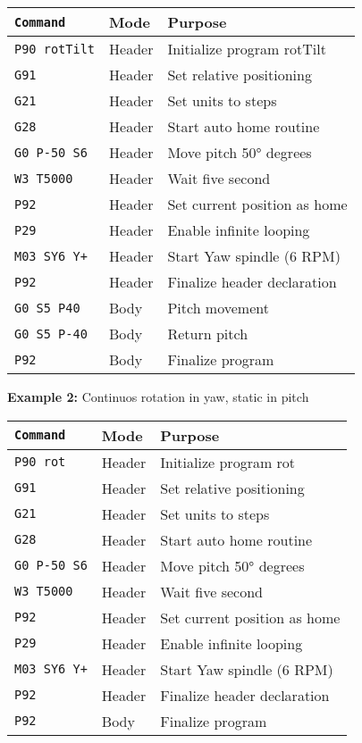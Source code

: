 \begin{tabular}{lll}
  \hline
  \texttt{Command}     & Mode   & Purpose                      \\
  \hline
  \texttt{P90 rotTilt} & Header & Initialize program rotTilt   \\
  \texttt{G91}         & Header & Set relative positioning     \\
  \texttt{G21}         & Header & Set units to steps           \\
  \texttt{G28}         & Header & Start auto home routine      \\
  \texttt{G0 P-50 S6}  & Header & Move pitch 50° degrees       \\
  \texttt{W3 T5000}    & Header & Wait five second              \\
  \texttt{P92}         & Header & Set current position as home \\
  \texttt{P29}         & Header & Enable infinite looping      \\
  \texttt{M03 SY6 Y+}  & Header & Start Yaw spindle (6 RPM)    \\
  \texttt{P92}         & Header & Finalize header declaration  \\
  \texttt{G0 S5 P40}   & Body   & Pitch movement               \\
  \texttt{G0 S5 P-40}  & Body   & Return pitch                 \\
  \texttt{P92}         & Body   & Finalize program             \\
  \hline
\end{tabular}


\vspace{0.3cm}
\noindent
\textbf{Example 2:} Continuos rotation in yaw, static in pitch


\begin{tabular}{lll}
  \hline
  \texttt{Command}    & Mode   & Purpose                      \\
  \hline
  \texttt{P90 rot}    & Header & Initialize program rot       \\
  \texttt{G91}        & Header & Set relative positioning     \\
  \texttt{G21}        & Header & Set units to steps           \\
  \texttt{G28}        & Header & Start auto home routine      \\
  \texttt{G0 P-50 S6} & Header & Move pitch 50° degrees       \\
  \texttt{W3 T5000}   & Header & Wait five second              \\
  \texttt{P92}        & Header & Set current position as home \\
  \texttt{P29}        & Header & Enable infinite looping      \\
  \texttt{M03 SY6 Y+} & Header & Start Yaw spindle (6 RPM)    \\
  \texttt{P92}        & Header & Finalize header declaration  \\
  \texttt{P92}        & Body   & Finalize program             \\
  \hline
\end{tabular}


